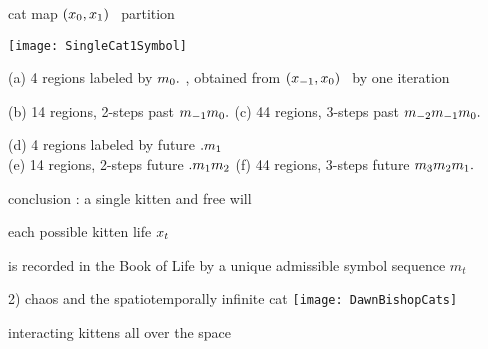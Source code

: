 \begin{frame}{cat map $(x_{0},x_{1})$  \statesp\ partition}
\begin{center}
	\texttt{[image: SingleCat1Symbol]}
\end{center}

{\scriptsize
(a) 4 regions labeled by ${m_{0}}.$ , obtained from
$(x_{-1},x_{0})$ \statesp\ by one iteration

\medskip

(b) 14 regions, 2-steps past ${m_{-1}}{m_{0}}.$
\quad (c) 44 regions, 3-steps past ${m_{-2}}{m_{-1}}{m_{0}}.$

\medskip

(d) 4 regions labeled by future $.{m_{1}}$
\\
(e) 14 regions, 2-steps  future $.{m_{1}}{m_{2}}$
\quad (f) 44 regions, 3-steps future {\brick} ${m_{3}}{m_{2}}{m_{1}}.$
}
\end{frame}

\begin{frame}{conclusion : a single kitten and free will}

each possible kitten life $x_t$

\vfill
is recorded in the Book of Life by a unique admissible symbol sequence $m_t$
\end{frame}


\begin{frame}{2) chaos and the spatiotemporally infinite cat}
\hfill\texttt{[image: DawnBishopCats]}

interacting kittens all over the space
\end{frame}


